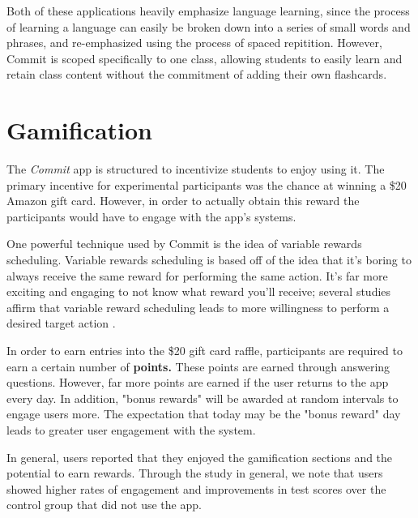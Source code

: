 \par Both of these applications heavily emphasize language learning, since the process of learning a language can easily be broken down into a series of small words and phrases, and re-emphasized using the process of spaced repitition. However, Commit is scoped specifically to one class, allowing students to easily learn and retain class content without the commitment of adding their own flashcards.

\section{Gamification}
\par The \textit{Commit} app is structured to incentivize students to enjoy using it. The primary incentive for experimental participants was the chance at winning a \$20 Amazon gift card. However, in order to actually obtain this reward the participants would have to engage with the app's systems.

\par One powerful technique used by Commit is the idea of variable rewards scheduling. Variable rewards scheduling is based off of the idea that it's boring to always receive the same reward for performing the same action. It's far more exciting and engaging to not know what reward you'll receive; several studies affirm that variable reward scheduling leads to more willingness to perform a desired target action \cite{dodin2001integrated}.

\par In order to earn entries into the \$20 gift card raffle, participants are required to earn a certain number of \textbf{points.} These points are earned through answering questions. However, far more points are earned if the user returns to the app every day. In addition, "bonus rewards" will be awarded at random intervals to engage users more. The expectation that today may be the "bonus reward" day leads to greater user engagement with the system.

\par In general, users reported that they enjoyed the gamification sections and the potential to earn rewards. Through the study in general, we note that users showed higher rates of engagement and improvements in test scores over the control group that did not use the app.